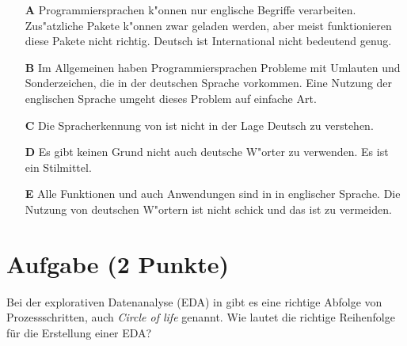 \documentclass[a4paper, 10pt]{scrartcl}\usepackage[]{graphicx}\usepackage[]{color}
\begin{document}
\begin{enumerate}
\item [\textbf{A} \msquare] Programmiersprachen k{"o}nnen nur englische Begriffe verarbeiten. Zus{"a}tzliche Pakete k{"o}nnen zwar geladen werden, aber meist funktionieren diese Pakete nicht richtig. Deutsch ist International nicht bedeutend genug.
\item [\textbf{B} \msquare] Im Allgemeinen haben Programmiersprachen Probleme mit Umlauten und Sonderzeichen, die in der deutschen Sprache vorkommen. Eine Nutzung der englischen Sprache umgeht dieses Problem auf einfache Art.
\item [\textbf{C} \msquare] Die Spracherkennung von \Rlogo ist nicht in der Lage Deutsch zu verstehen.
\item [\textbf{D} \msquare] Es gibt keinen Grund nicht auch deutsche W{"o}rter zu verwenden. Es ist ein Stilmittel.
\item [\textbf{E} \msquare] Alle Funktionen und auch Anwendungen sind in \Rlogo in englischer Sprache. Die Nutzung von deutschen W{"o}rtern ist nicht schick und das ist zu vermeiden.
\end{enumerate}

\section{Aufgabe \hfill (2 Punkte)}

Bei der explorativen Datenanalyse (EDA) in \Rlogo gibt es eine richtige Abfolge von Prozessschritten, auch \textit{Circle of life} genannt. Wie lautet die richtige Reihenfolge für die Erstellung einer EDA?
\end{document}
